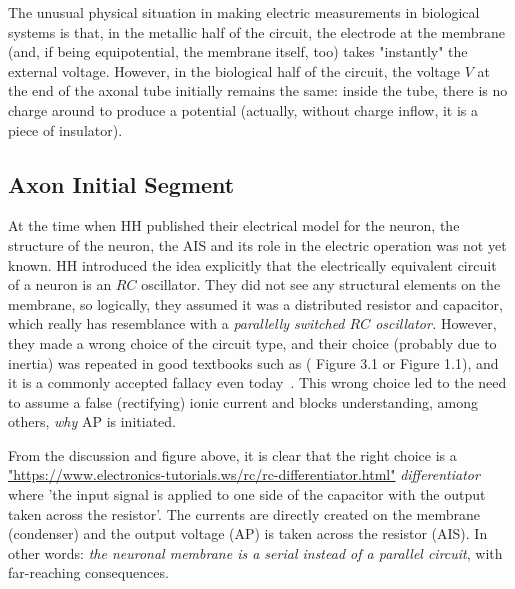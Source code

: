 The unusual physical situation in making electric measurements in biological systems is that, in the metallic half
of the circuit, the electrode at the membrane (and, if being equipotential,
the membrane itself, too) takes "instantly" the external voltage.
However, in the biological half of the circuit, the voltage $V$ at
the end of the axonal tube initially remains the same: inside the
tube, there is no charge around to produce a potential (actually,
without charge inflow, it is a piece of insulator). 


\subsection{Axon Initial Segment\label{sec:Physics-Axonal-InitialSegment}}


At the time when \gls{HH}
published \cite{HodgkinHuxley:1952} their electrical model for the neuron, the structure of the neuron, the \gls{AIS}
and its role in the electric operation was not yet known.
\gls{HH} introduced the idea explicitly that the electrically equivalent circuit
of a neuron is an $RC$ oscillator.
They did not see any structural elements on the membrane,
so logically, they assumed it was a distributed resistor and capacitor,
which really has resemblance with a \textit{parallelly switched $RC$ oscillator.}
However, they made a wrong choice of the circuit type, and their choice (probably due to inertia)
was repeated in good textbooks such as  (\cite{ JohnstonWuNeurophysiology:1995}
Figure 3.1 or \cite{KochBiophysics:1999} Figure 1.1), and
it is a commonly accepted fallacy even today~\cite{NeuralDynamicsGertsner:2014}.
This wrong choice led to the need to assume a false (rectifying) ionic current and blocks
understanding, among others, \textit{why} \gls{AP} is initiated.

From the discussion and figure above, it is clear that the right choice is a
\url{"https://www.electronics-tutorials.ws/rc/rc-differentiator.html"} \textit{differentiator}  where
'the input signal is applied to one side of the capacitor with the output taken across the resistor'.
The currents
are directly created on the membrane (condenser) and the output voltage
 (\gls{AP})
is taken across the resistor (\gls{AIS}).
In other words: \textit{the neuronal membrane is a serial instead of a parallel circuit},
with far-reaching consequences.

